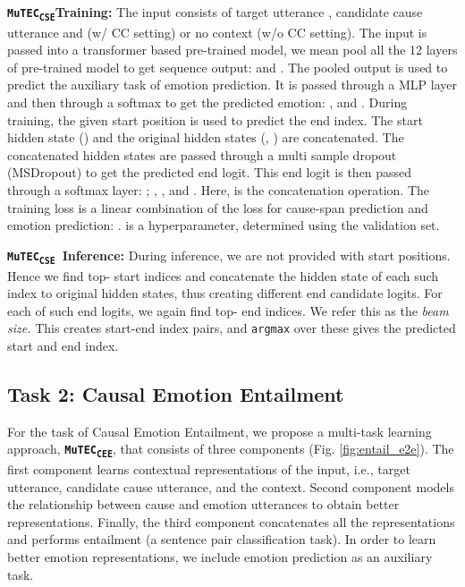 \documentclass{article}
\newcommand{\subone}{\textbf{\texttt{MuTEC\textsubscript{CSE}}}}
\newcommand{\subtwo}{\textbf{\texttt{MuTEC\textsubscript{CEE}}}}
\begin{document}
\noindent\textbf{\subone Training:} The input consists of target utterance , candidate cause utterance  and  (w/ CC setting) or no context (w/o CC setting). The input is passed into a transformer based pre-trained model, we mean pool all the 12 layers of pre-trained model to get sequence output:  and . The pooled output is used to predict the auxiliary task of emotion prediction. It is passed through a MLP layer and then through a softmax to get the predicted emotion: , and . During training, the given start position is used to predict the end index. The start hidden state () and the original hidden states (, ) are concatenated. The  concatenated hidden states are passed through a multi sample dropout (MSDropout) \cite{inoue2019multi} to get the predicted end logit. This end logit is then passed through a softmax layer: ; , , and . Here,  is the concatenation operation. The training loss is a linear combination of the loss for cause-span prediction and emotion prediction: .  is a hyperparameter, determined using the validation set.


{\label{sec:mutec_infer}
\noindent\textbf{\subone\ Inference:} During inference, we are not provided with start positions. Hence we find top- start indices and concatenate the hidden state of each such index to original hidden states, thus creating  different end candidate logits. For each of such  end logits, we again find top- end indices. We refer this  as the \textit{beam size.} This creates  start-end index pairs, and \texttt{argmax} over these  gives the predicted start and end index.}

\subsection{Task 2: Causal Emotion Entailment}
\vspace{-3mm}
For the task of Causal Emotion Entailment, we propose a multi-task learning approach, \subtwo, that consists of three components (Fig. \ref{fig:entail_e2e}). The first component learns contextual representations of the input, i.e., target utterance, candidate cause utterance, and the context. Second component models the relationship between cause and emotion utterances to obtain better representations. Finally, the third component concatenates all the representations and performs entailment (a sentence pair classification task). In order to learn better emotion representations, we include emotion prediction as an auxiliary task. 
\end{document}
